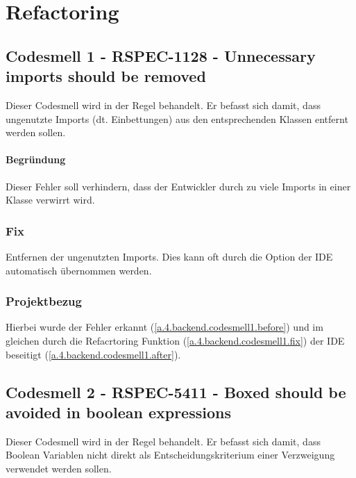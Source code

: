 
\chapter{Refactoring}

	\section{Codesmell 1 - RSPEC-1128 - Unnecessary imports should be removed \cite{codeSmell1.sonar}}
	Dieser Codesmell wird in der Regel  behandelt. Er befasst sich damit, dass ungenutzte Imports (dt. Einbettungen) aus den entsprechenden Klassen entfernt werden sollen.
	\subsubsection{Begründung}
	Dieser Fehler soll verhindern, dass der Entwickler durch zu viele Imports in einer Klasse verwirrt wird.
		
		\subsection{Fix}
		Entfernen der ungenutzten Imports. Dies kann oft durch die Option  der IDE automatisch übernommen werden.
		
		\subsection{Projektbezug}
		Hierbei wurde der Fehler erkannt (\cref{a.4.backend.codesmell1.before}) und im gleichen durch die Refacrtoring Funktion (\cref{a.4.backend.codesmell1.fix}) der \ac{IDE} beseitigt (\cref{a.4.backend.codesmell1.after}).
		

	\section{Codesmell 2 - RSPEC-5411 - Boxed  should be avoided in boolean expressions \cite{codeSmell2.sonar}}
	Dieser Codesmell wird in der Regel  behandelt. Er befasst sich damit, dass Boolean Variablen nicht direkt als Entscheidungskriterium einer Verzweigung verwendet werden sollen.
